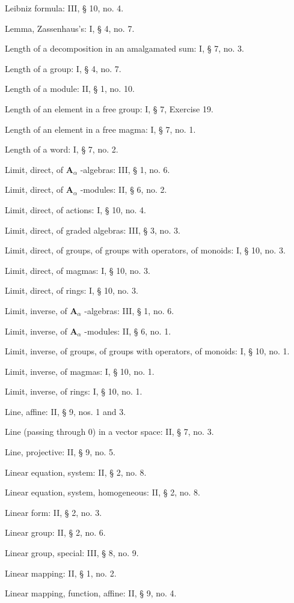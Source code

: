 Leibniz formula: III, § 10, no. 4.

Lemma, Zassenhaus's: I, § 4, no. 7.

Length of a decomposition in an amalgamated sum: I, § 7, no. 3.

Length of a group: I, § 4, no. 7.

Length of a module: II, § 1, no. 10.

Length of an element in a free group: I, § 7, Exercise 19.

Length of an element in a free magma: I, § 7, no. 1.

Length of a word: I, § 7, no. 2.

Limit, direct, of \(\mathbf{A}_{\alpha}\) -algebras: III, § 1, no. 6.

Limit, direct, of \(\mathbf{A}_{\alpha}\) -modules: II, § 6, no. 2.

Limit, direct, of actions: I, § 10, no. 4.

Limit, direct, of graded algebras: III, § 3, no. 3.

Limit, direct, of groups, of groups with operators, of monoids: I, § 10, no. 3.

Limit, direct, of magmas: I, § 10, no. 3.

Limit, direct, of rings: I, § 10, no. 3.

Limit, inverse, of \(\mathbf{A}_{\alpha}\) -algebras: III, § 1, no. 6.

Limit, inverse, of \(\mathbf{A}_{\alpha}\) -modules: II, § 6, no. 1.

Limit, inverse, of groups, of groups with operators, of monoids: I, § 10, no. 1.

Limit, inverse, of magmas: I, § 10, no. 1.

Limit, inverse, of rings: I, § 10, no. 1.

Line, affine: II, § 9, nos. 1 and 3.

Line (passing through 0) in a vector space: II, § 7, no. 3.

Line, projective: II, § 9, no. 5.

Linear equation, system: II, § 2, no. 8.

Linear equation, system, homogeneous: II, § 2, no. 8.

Linear form: II, § 2, no. 3.

Linear group: II, § 2, no. 6.

Linear group, special: III, § 8, no. 9.

Linear mapping: II, § 1, no. 2.

Linear mapping, function, affine: II, § 9, no. 4.

